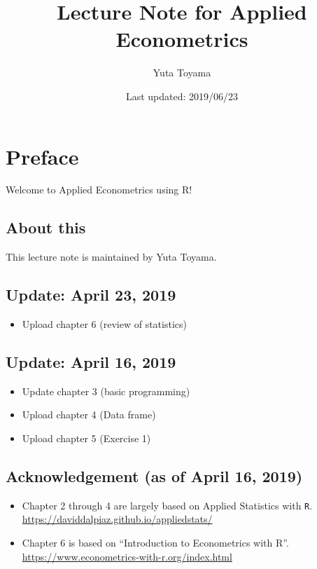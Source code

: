 \documentclass[]{book}
\title{Lecture Note for Applied Econometrics}
\author{Yuta Toyama}
\date{Last updated: 2019/06/23}
\providecommand{\tightlist}{%
  \setlength{\itemsep}{0pt}\setlength{\parskip}{0pt}}
\begin{document}
\maketitle

{
\setcounter{tocdepth}{1}
\tableofcontents
}
\chapter{Preface}\label{preface}

Welcome to Applied Econometrics using R!

\section{About this}\label{about-this}

This lecture note is maintained by Yuta Toyama.

\section{Update: April 23, 2019}\label{update-april-23-2019}

\begin{itemize}
\tightlist
\item
  Upload chapter 6 (review of statistics)
\end{itemize}

\section{Update: April 16, 2019}\label{update-april-16-2019}

\begin{itemize}
\tightlist
\item
  Update chapter 3 (basic programming)
\item
  Upload chapter 4 (Data frame)
\item
  Upload chapter 5 (Exercise 1)
\end{itemize}

\section{Acknowledgement (as of April 16,
2019)}\label{acknowledgement-as-of-april-16-2019}

\begin{itemize}
\tightlist
\item
  Chapter 2 through 4 are largely based on Applied Statistics with
  \texttt{R}. \url{https://daviddalpiaz.github.io/appliedstats/}
\item
  Chapter 6 is based on ``Introduction to Econometrics with R''.
  \url{https://www.econometrics-with-r.org/index.html}
\end{itemize}
\end{document}
